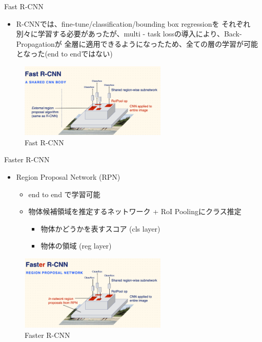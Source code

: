 \documentclass[aspectratio=169, dvipdfmx, 11pt]{beamer}
\begin{document}
\begin{frame}{Fast R-CNN}
    \begin{itemize}
        \item R-CNNでは、fine-tune/classification/bounding box regressionを
        それぞれ別々に学習する必要があったが、multi - task lossの導入により、Back-Propagationが
        全層に適用できるようになったため、全ての層の学習が可能となった(end to endではない) \\
    \end{itemize}
    \begin{figure}
        \centering
		\includegraphics[width=7cm]{./figures/fast_rcnn2.png}
        \caption{Fast R-CNN}
    \end{figure}
\end{frame}


\begin{frame}{Faster R-CNN}
    \begin{itemize}
    	\item Region Proposal Network (RPN)
    	\begin{itemize}
            \item end to end で学習可能 \\
            \item 物体候補領域を推定するネットワーク + RoI Poolingにクラス推定 \\
            \begin{itemize}
                \item 物体かどうかを表すスコア (cls layer) \\
                \item 物体の領域 (reg layer) \\
            \end{itemize}
        \end{itemize}
    \end{itemize}
    \begin{figure}
        \centering
		\includegraphics[width=7cm]{./figures/faster_rcnn.png}
        \caption{Faster R-CNN}
    \end{figure}
\end{frame}
\end{document}
